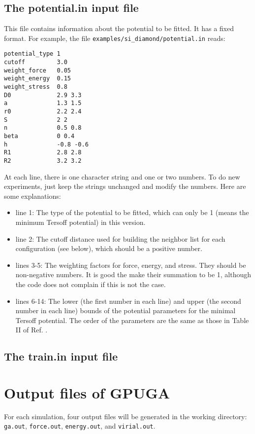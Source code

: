 \documentclass[12pt,a4paper]{report}
\begin{document}
\subsection{The potential.in input file}

This file contains information about the potential to be fitted. It has a fixed format. For example, the file \verb"examples/si_diamond/potential.in" reads:
\begin{verbatim}
potential_type 1
cutoff         3.0
weight_force   0.05
weight_energy  0.15
weight_stress  0.8
D0             2.9 3.3
a              1.3 1.5
r0             2.2 2.4
S              2 2
n              0.5 0.8
beta           0 0.4
h              -0.8 -0.6
R1             2.8 2.8
R2             3.2 3.2
\end{verbatim}
At each line, there is one character string and one or two numbers. To do new experiments, just keep the strings unchanged and modify the numbers. Here are some explanations:
\begin{itemize}
\item line 1: The type of the potential to be fitted, which can only be 1  (means the minimum Tersoff potential) in this version.
\item line 2: The cutoff distance used for building the neighbor list for each configuration (see below), which should be a positive number.
\item lines 3-5: The weighting factors for force, energy, and stress. They should be non-negative numbers. It is good the make their summation to be 1, although the code does not complain if this is not the case.
\item lines 6-14: The lower (the first number in each line) and upper (the second number in each line) bounds of the potential parameters for the minimal Tersoff potential. The order of the parameters are the same as those in Table II of Ref. \cite{fan2019arxiv}.
\end{itemize}


\subsection{The train.in input file}


\section{Output files of GPUGA}

For each simulation, four output files will be generated in the working directory: \verb"ga.out", \verb"force.out", \verb"energy.out", and \verb"virial.out".
\end{document}
